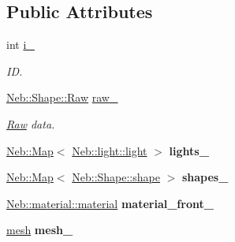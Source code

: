 \subsection*{\-Public \-Attributes}
\begin{DoxyCompactItemize}
\item 
\hypertarget{classNeb_1_1Shape_1_1shape_a4ea8904ea7cb02b3580586d23ef65736}{int \hyperlink{classNeb_1_1Shape_1_1shape_a4ea8904ea7cb02b3580586d23ef65736}{i\-\_\-}}\label{classNeb_1_1Shape_1_1shape_a4ea8904ea7cb02b3580586d23ef65736}

\begin{DoxyCompactList}\small\item\em \-I\-D. \end{DoxyCompactList}\item 
\hypertarget{classNeb_1_1Shape_1_1shape_a8aba02e1580ff15ee8b91ded3a5f95c2}{\hyperlink{classNeb_1_1Shape_1_1Raw}{\-Neb\-::\-Shape\-::\-Raw} \hyperlink{classNeb_1_1Shape_1_1shape_a8aba02e1580ff15ee8b91ded3a5f95c2}{raw\-\_\-}}\label{classNeb_1_1Shape_1_1shape_a8aba02e1580ff15ee8b91ded3a5f95c2}

\begin{DoxyCompactList}\small\item\em \hyperlink{classNeb_1_1Shape_1_1Raw}{\-Raw} data. \end{DoxyCompactList}\item 
\hypertarget{classNeb_1_1Shape_1_1shape_a3070b9f1cecd871b3bf0febbef8de711}{\hyperlink{classNeb_1_1Map}{\-Neb\-::\-Map}$<$ \hyperlink{classNeb_1_1light_1_1light}{\-Neb\-::light\-::light} $>$ {\bfseries lights\-\_\-}}\label{classNeb_1_1Shape_1_1shape_a3070b9f1cecd871b3bf0febbef8de711}

\item 
\hypertarget{classNeb_1_1Shape_1_1shape_a880326855a69925260706d175a1ccccc}{\hyperlink{classNeb_1_1Map}{\-Neb\-::\-Map}$<$ \hyperlink{classNeb_1_1Shape_1_1shape}{\-Neb\-::\-Shape\-::shape} $>$ {\bfseries shapes\-\_\-}}\label{classNeb_1_1Shape_1_1shape_a880326855a69925260706d175a1ccccc}

\item 
\hypertarget{classNeb_1_1Shape_1_1shape_a02bd5170774b0217748d01376795e50d}{\hyperlink{classNeb_1_1material_1_1material}{\-Neb\-::material\-::material} {\bfseries material\-\_\-front\-\_\-}}\label{classNeb_1_1Shape_1_1shape_a02bd5170774b0217748d01376795e50d}

\item 
\hypertarget{classNeb_1_1Shape_1_1shape_af4ece0a2eed3386efae772a88a53b757}{\hyperlink{classNeb_1_1mesh}{mesh} {\bfseries mesh\-\_\-}}\label{classNeb_1_1Shape_1_1shape_af4ece0a2eed3386efae772a88a53b757}


\end{DoxyCompactItemize}

